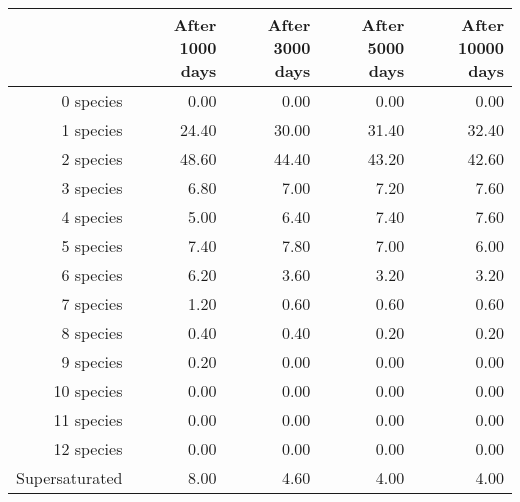 \begin{table}[ht]
\centering
\begin{tabular}{rrrrr}
  \hline
 & After 1000 days & After 3000 days & After 5000 days & After 10000 days \\ 
  \hline
0 species & 0.00 & 0.00 & 0.00 & 0.00 \\ 
  1 species & 24.40 & 30.00 & 31.40 & 32.40 \\ 
  2 species & 48.60 & 44.40 & 43.20 & 42.60 \\ 
  3 species & 6.80 & 7.00 & 7.20 & 7.60 \\ 
  4 species & 5.00 & 6.40 & 7.40 & 7.60 \\ 
  5 species & 7.40 & 7.80 & 7.00 & 6.00 \\ 
  6 species & 6.20 & 3.60 & 3.20 & 3.20 \\ 
  7 species & 1.20 & 0.60 & 0.60 & 0.60 \\ 
  8 species & 0.40 & 0.40 & 0.20 & 0.20 \\ 
  9 species & 0.20 & 0.00 & 0.00 & 0.00 \\ 
  10 species & 0.00 & 0.00 & 0.00 & 0.00 \\ 
  11 species & 0.00 & 0.00 & 0.00 & 0.00 \\ 
  12 species & 0.00 & 0.00 & 0.00 & 0.00 \\ 
  Supersaturated & 8.00 & 4.60 & 4.00 & 4.00 \\ 
   \hline
\end{tabular}
\end{table}
